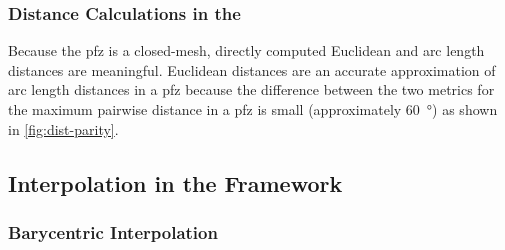 \documentclass[preprint,12pt]{elsarticle}
\begin{document}

\subsubsection{Distance Calculations in the }
\label{sec:methods:distancepFZ}

Because the \gls{pfz} is a closed-mesh, directly computed Euclidean and arc length distances are meaningful. Euclidean distances are an accurate approximation of arc length distances in a \gls{pfz} because the difference between the two metrics for the maximum pairwise distance in a \gls{pfz} is small (approximately \SI{60}{\degree}) as shown in \cref{fig:dist-parity}.

\subsection{Interpolation in the  Framework}
\label{sec:methods:interpolation}

\subsubsection{Barycentric Interpolation}
\label{sec:methods:bary}
\end{document}
